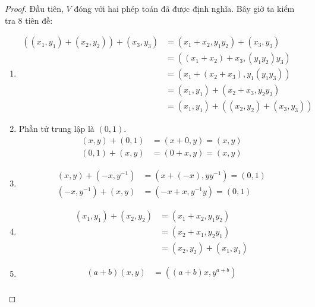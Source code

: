 \documentclass[class=linearalgebra,crop=false]{standalone}
\begin{document}
\begin{proof}Đầu tiên, $V$ đóng với hai phép toán đã được định nghĩa. Bây giờ ta kiểm tra 8 tiên đề:
    \begin{enumerate}[label = (V\arabic*)]
        \item
            \begin{align*}
                ((x_{1}, y_{1}) + (x_{2}, y_{2})) + (x_{3}, y_{3}) &= (x_{1} + x_{2}, y_{1}y_{2}) + (x_{3}, y_{3}) \\
                                                                   &= ((x_{1} + x_{2}) + x_{3}, (y_{1}y_{2})y_{3}) \\
                                                                   &= (x_{1} + (x_{2} + x_{3}), y_{1}(y_{1}y_{3})) \\
                                                                   &= (x_{1}, y_{1}) + (x_{2} + x_{3}, y_{2}y_{3}) \\
                                                                   &= (x_{1}, y_{1}) + ((x_{2}, y_{2}) + (x_{3}, y_{3}))
            \end{align*}
        \item Phần tử trung lập là $(0, 1)$.
            \begin{align*}
                (x, y) + (0, 1) &= (x + 0, y) = (x, y) \\
                (0, 1) + (x, y) &= (0 + x, y) = (x, y)
            \end{align*}
        \item
            \begin{align*}
                (x, y) + (-x, y^{-1}) &= (x + (-x), yy^{-1}) = (0, 1) \\
                (-x, y^{-1}) + (x, y) &= (-x + x, y^{-1}y) = (0, 1)
            \end{align*}
        \item
            \begin{align*}
                (x_{1}, y_{1}) + (x_{2}, y_{2}) &= (x_{1} + x_{2}, y_{1}y_{2}) \\
                                                &= (x_{2} + x_{1}, y_{2}y_{1}) \\
                                                &= (x_{2}, y_{2}) + (x_{1}, y_{1})
            \end{align*}
        \item
            \begin{align*}
                (a + b)(x, y) &= ((a + b)x, y^{a + b}) \\

\end{align*}
\end{enumerate}
\end{proof}
\end{document}
